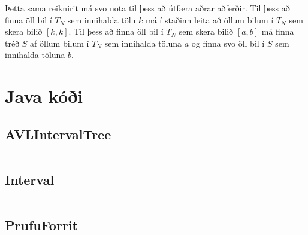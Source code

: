 \documentclass[a4paper,oneside]{article}
\begin{document}
\noindent
Þetta sama reiknirit má svo nota til þess að útfæra aðrar aðferðir.
Til þess að finna öll bil í $T_N$ sem innihalda tölu $k$ má í staðinn leita að öllum bilum í $T_N$ sem skera bilið $[k,k]$.
Til þess að finna öll bil í $T_N$ sem skera bilið $[a,b]$ má finna tréð $S$ af öllum bilum í $T_N$ sem innihalda töluna $a$ og finna svo öll bil í $S$ sem innihalda töluna $b$.




\section{Java kóði}
\subsection{AVLIntervalTree}
\inputminted[]{java}{../AVLIntervalTree.java}

\subsection{Interval}
\inputminted[]{java}{../Interval.java}

\subsection{PrufuForrit}
\inputminted[]{java}{../PrufuForrit.java}
\end{document}
